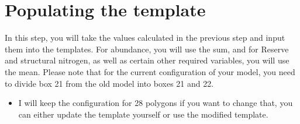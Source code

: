 \documentclass[a4paper]{article}
\begin{document}
\section{Populating the template}
\label{sec:org3cf57c7}
In this step, you will take the values calculated in the previous step and input
them into the templates. For abundance, you will use the sum, and for Reserve and
structural nitrogen, as well as certain other required variables, you will use the
mean. Please note that for the current configuration of your model, you need to
divide box 21 from the old model into boxes 21 and 22.
\begin{itemize}
\item I will keep the configuration for 28 polygons if you want to change that, you can either update the template yourself or use the modified template.
\end{itemize}
\end{document}
